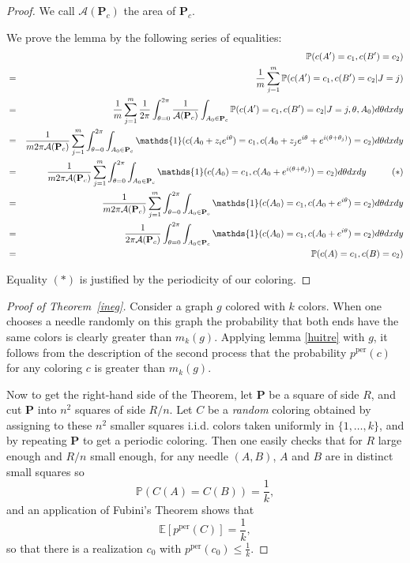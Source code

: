 \documentclass[a4paper,11pt]{article}
\theoremstyle{definition}
\theoremstyle{remark}
\renewcommand{\Pr}{\mathbb{P}}
\newcommand{\Esp}{\mathbb{E}}
\renewcommand{\P}{\mathbf{P}}
\newcommand{\pper}{p^{\mathrm{per}}}
\begin{document}
\begin{proof}
We call $\mathcal{A}(\P_c)$ the area of $\P_c$.

We prove the lemma by the following series of equalities:
\begin{eqnarray*}
& & \mathbb{P}(c(A') = c_1, c(B') = c_2) \\
  &=& \frac{1}{m}\sum_{j=1}^{m} \mathbb{P}(c(A') = c_1, c(B') = c_2 | J=j)  \\
  &=& \frac{1}{m}\sum_{j=1}^{m}  \frac{1}{2\pi}\int_{\theta =0} ^{2\pi} \frac{1}{\mathcal{A}(\P_c)}\int_{A_0 \in \P_c} \mathbb{P}(c(A') = c_1, c(B') = c_2 | J=j, \theta, A_0) d\theta dx dy \\  
  &=& \frac{1}{m 2\pi \mathcal{A}(\P_c)}\sum_{j=1}^{m}\int_{\theta =0} ^{2\pi} \int_{A_0 \in \P_c} \mathds{1}(c(A_0 + z_i e^{i\theta}) = c_1, c(A_0 +z_j e^{i\theta} + e^{i (\theta + \theta_j)}) = c_2) d\theta dx dy \\  
    &=& \frac{1}{m 2\pi \mathcal{A}(\P_c)}\sum_{j=1}^{m} \int_{\theta =0} ^{2\pi} \int_{A_0 \in \P_c} \mathds{1}(c(A_0) = c_1, c(A_0 + e^{i (\theta + \theta_j)}) = c_2 ) d\theta dx dy \hspace{1 cm} (*)\\ 
    &=& \frac{1}{m 2\pi \mathcal{A}(\P_c)}\sum_{j=1}^{m} \int_{\theta =0} ^{2\pi} \int_{A_0 \in \P_c} \mathds{1}(c(A_0) = c_1, c(A_0 + e^{i \theta}) = c_2 ) d\theta dx dy \\ 
    &=& \frac{1}{2\pi \mathcal{A}(\P_c)}\int_{\theta =0} ^{2\pi} \int_{A_0 \in \P_c} \mathds{1}(c(A_0) = c_1, c(A_0 + e^{i \theta}) = c_2 ) d\theta dx dy \\ 
    &=& \mathbb{P}(c(A) = c_1, c(B) = c_2)
\end{eqnarray*}

Equality $(*)$ is justified by the periodicity of our coloring.
\end{proof}

\begin{proof}[Proof of Theorem~\ref{ineg}]
Consider a graph $g$ colored with $k$ colors. When one chooses a needle
randomly on this graph the probability that both ends have the same
colors is clearly greater than $m_k(g)$. Applying lemma \ref{huitre} with $g$, 
it follows from the description of the second process that the probability 
$\pper(c)$ for any coloring $c$ is greater than $m_k(g)$.

Now to get the right-hand side of the Theorem, let $\P$ be a square of side $R$,
and cut $\P$ into $n^2$ squares of side $R/n$. Let $C$ be a \textit{random} 
coloring obtained by assigning to these $n^2$ smaller squares i.i.d. colors
taken uniformly in $\{1,\dots,k\}$, and by repeating $\P$ to get a periodic 
coloring. Then one easily checks that for $R$ large enough and $R/n$ small
enough, for any needle $(A,B)$, $A$ and $B$ are in distinct small squares so
$$\Pr(C(A)=C(B)) = \frac1k,$$
and an application of Fubini's Theorem shows that
$$\Esp[\pper(C)] = \frac1k,$$
so that there is a realization $c_0$ with $\pper(c_0) \leq \frac1k$.
\end{proof}
\end{document}
